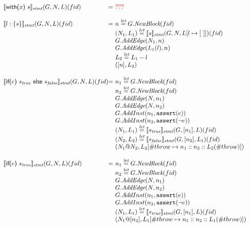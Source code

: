 \[\begin{array}{l@{}l@{~}l}
\transfun{\ircfgwith{x}{s}}_{\emph{stmt}}(G,N,L)(fid) & = &
	{\inred ???} \\
	& & \\

\transfun{\irlabel{l}{s}}_{\emph{stmt}}(G,N,L)(fid) & = &
	n \letval G.\emph{NewBlock}(fid)\\\
	& & (N_1,L_1) \letval \transfun{s}_{\emph{stmt}}(G,N,L[l\mapsto[\ ]])(fid)\\
	& & G.\emph{AddEdge}(N_1,n)\\
	& & G.\emph{AddEdge}(L_1(l),n)\\
	& & L_2 \letval L_1 - l\\
	& & ([n],L_2 ) \\
	& & \\
	
\transfun{\irifelse{e}{s_{\emph{true}}}{s_{\emph{false}}}}_{\emph{stmt}}(G,N,L)(fid) & = &
	n_1 \letval G.\emph{NewBlock}(fid)\\
	& & n_2 \letval G.\emph{NewBlock}(fid)\\
	& & G.\emph{AddEdge}(N,n_1)\\
	& & G.\emph{AddEdge}(N,n_2)\\
	& & G.AddInst(n_1, \TT{assert}(e))\\
	& & G.AddInst(n_2, \TT{assert}(\neg e))\\
	& & (N_1,L_1) \letval \transfun{s_{\emph{true}}}_{\emph{stmt}}(G,[n_1],L)(fid)\\
	& & (N_2,L_2) \letval \transfun{s_{\emph{false}}}_{\emph{stmt}}(G,[n_2],L_1)(fid)\\
	& & (N_1@N_2,L_2[\#throw \mapsto n_1::n_2::L_2(\#throw)])\\
	& & \\

\transfun{\ircfgif{e}{s_{\emph{true}}}{}}_{\emph{stmt}}(G,N,L)(fid) & = &
	n_1 \letval G.\emph{NewBlock}(fid)\\
	& & n_2 \letval G.\emph{NewBlock}(fid)\\
	& & G.\emph{AddEdge}(N,n_1)\\
	& & G.\emph{AddEdge}(N,n_2)\\
	& & G.AddInst(n_1, \TT{assert}(e))\\
	& & G.AddInst(n_2, \TT{assert}(\neg e))\\
	& & (N_1,L_1) \letval \transfun{s_{\emph{true}}}_{\emph{stmt}}(G,[n_1],L)(fid)\\
	& & (N_1@[n_2],L_1[\#throw \mapsto n_1::n_2::L_1(\#throw)])\\
	& & \\

\end{array}
\]

